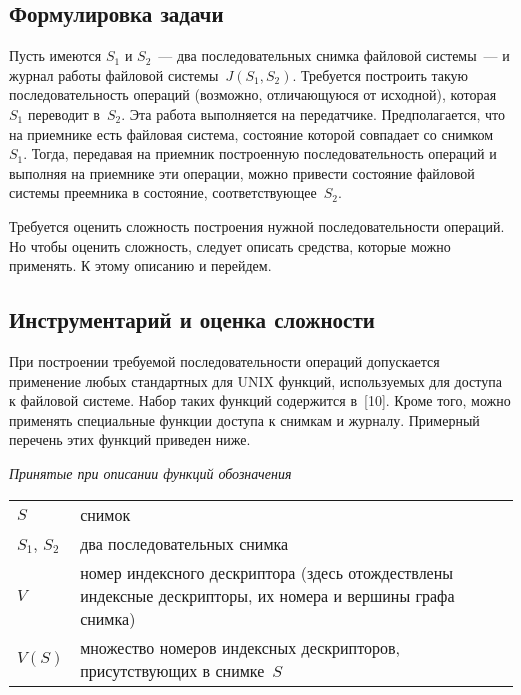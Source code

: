\begin{multicols}{2}
\subsection{Формулировка задачи}

      Пусть имеются $S_1$ и $S_2$~--- два последовательных снимка файловой 
системы~--- и журнал работы файловой системы~$J(S_1, S_2)$. Требуется 
построить такую последовательность операций\linebreak
(возможно, отличающуюся от 
исходной), которая $S_1$ переводит в~$S_2$. Эта работа выполняется на 
передатчике. Предполагается, что на приемнике есть файловая система, 
состояние которой совпадает со снимком~$S_1$. Тогда, передавая на приемник 
построенную последовательность операций и выполняя на приемнике эти 
операции, можно привести состояние файловой системы преемника в 
состояние, соответствующее~$S_2$.
      
      \smallskip
      Требуется оценить сложность построения нужной последовательности 
операций. Но чтобы оценить сложность, следует описать средства, которые 
можно применять. К этому описанию и перейдем. 
      
      \subsection{Инструментарий и оценка сложности}
      
      При построении требуемой по\-сле\-до\-ва\-тель\-ности операций допускается 
применение любых стандартных для UNIX функций, используемых для 
доступа к файловой системе. Набор таких функций содержится в~[10]. Кроме 
того, можно применять специальные функции доступа к снимкам и журналу. 
Примерный перечень этих функций приведен ниже. 

\begin{center}
\textit{Принятые при описании функций обозначения}
\end{center}

\noindent
{\tabcolsep=3pt
\begin{tabular}{lp{67.5mm}}
$S$ & снимок\\
$S_1$, $S_2$ &  два последовательных снимка\\
$V$ &  номер индексного дескриптора (здесь отож\-де\-ст\-вле\-ны индексные 
дескрипторы, их номера и вершины графа снимка)\\
$V(S)$ & множество номеров индексных дескрипторов, присутствующих в 
снимке~$S$
\end{tabular}
}


\end{multicols}
